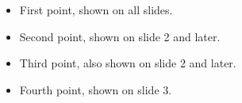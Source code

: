 \documentclass[compress]{beamer}
\begin{document}
\begin{frame}
  \begin{itemize}
    \item<1-> First point, shown on all slides.
    \item<2-> Second point, shown on slide 2 and later.
    \item<3-> Third point, also shown on slide 2 and later.
    \item<4-> Fourth point, shown on slide 3.
    \end{itemize}
  \end{frame}
\end{document}
